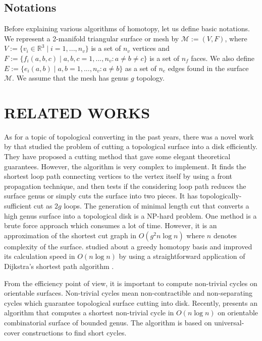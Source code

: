 \documentclass[a4paper,twoside]{article}
\begin{document}
\subsection{Notations}
Before explaining various algorithms of homotopy, let us define basic notations. We represent a 2-manifold triangular surface or mesh by $\mathscr{M}:=(V,F)$, where $V:=\{ v_{i}\in \mathbb{R}^3 \mid i = 1, ... , n_v\}$ is a set of $n_v$ vertices and $F:=\{ f_{i}(a,b,c) \mid a,b,c = 1, ... , n_v : a \neq b \neq c\}$ is a set of $n_f$ faces. We also define $E:=\{ e_{i}(a,b) \mid a,b = 1, ... , n_v : a \neq b\}$ as a set of $n_e$ edges found in the surface $\mathscr{M}$. We assume that the mesh has genus $g$ topology. 


\section{\uppercase{Related Works}}
\label{sec:related works}
\noindent As for a topic of topological converting in the past years, there was a novel work  by \cite{Erickson:2002:OCS:513400.513430} that studied the problem of cutting a topological surface into a disk efficiently. They have proposed a cutting method that gave some elegant theoretical guarantees. However, the algorithm is very complex to implement. It finds the shortest loop path connecting vertices to the vertex itself by using a front propagation technique, and then tests if the considering loop path reduces the surface genus or simply cuts the surface into two pieces. It has topologically-sufficient cut as $2g$ loops. The generation of minimal length cut that converts a high genus surface into a topological disk is a NP-hard problem. One method is a brute force approach which consumes a lot of time. However, it is an approximation of the shortest cut graph in $O(g^2 n \log n)$ where $n$ denotes complexity of the surface. \cite{Erickson:2005:GOH:1070432.1070581} studied about a greedy homotopy basis and improved its calculation speed in $O(n \log n)$
by using a straightforward application of Dijkstra's shortest path algorithm \cite{Dijkstra59anote}. 

From the efficiency point of view, it is important to compute non-trivial cycles on orientable surfaces. Non-trivial cycles mean non-contractible and non-separating cycles which guarantee topological surface cutting into disk. Recently, \cite{Kutz:2006:CSN:1137856.1137919} presents an algorithm that computes a shortest non-trivial cycle in $O(n \log n)$ on orientable combinatorial surface of bounded genus. The algorithm is based on universal-cover constructions to find short cycles.
\end{document}
